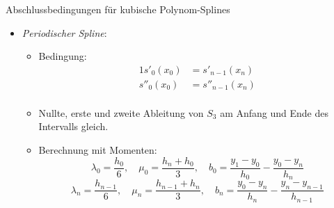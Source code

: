 \begin{defi}{Abschlussbedingungen für kubische Polynom-Splines}
\begin{itemize}
\begin{itemize}
              \end{itemize}
        \item \emph{Periodischer Spline}:
              \begin{itemize}
                  \item Bedingung:
                        \begin{alignat*}{1}
                            s'_0(x_0)  & = s'_{n-1}(x_n)  \\
                            s''_0(x_0) & = s''_{n-1}(x_n) \\
                        \end{alignat*}
                  \item Nullte, erste und zweite Ableitung von $S_3$ am Anfang und Ende des Intervalls gleich.
                  \item Berechnung mit Momenten:
                        \[
                            \lambda_0 = \frac{h_0}{6}, \quad \mu_0 = \frac{h_n + h_0}{3}, \quad b_0 = \frac{y_1 - y_0}{h_0} - \frac{y_0 - y_n}{h_n}
                        \]
                        \[
                            \lambda_n = \frac{h_{n-1}}{6}, \quad \mu_n = \frac{h_{n-1} + h_n}{3}, \quad b_n = \frac{y_0 - y_n}{h_n} - \frac{y_n - y_{n-1}}{h_{n-1}}
                        \]
              \end{itemize}
    \end{itemize}
\end{defi}

